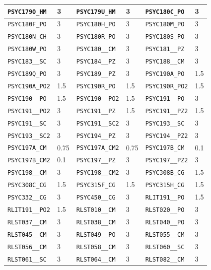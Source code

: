 \begin{longtable}{|l|l||l|l||l|l|}
    \verb|PSYC179O_HM| & 3 & \verb|PSYC179U_HM| & 3 & \verb|PSYC180C_PO| & 3\\\hline
    \verb|PSYC180F_PO| & 3 & \verb|PSYC180H_PO| & 3 & \verb|PSYC180M_PO| & 3\\\hline
    \verb|PSYC180N_CH| & 3 & \verb|PSYC180R_PO| & 3 & \verb|PSYC180S_PO| & 3\\\hline
    \verb|PSYC180W_PO| & 3 & \verb|PSYC180__CM| & 3 & \verb|PSYC181__PZ| & 3\\\hline
    \verb|PSYC183__SC| & 3 & \verb|PSYC184__PZ| & 3 & \verb|PSYC188__CM| & 3\\\hline
    \verb|PSYC189Q_PO| & 3 & \verb|PSYC189__PZ| & 3 & \verb|PSYC190A_PO| & 1.5\\\hline
    \verb|PSYC190A_PO2| & 1.5 & \verb|PSYC190R_PO| & 1.5 & \verb|PSYC190R_PO2| & 1.5\\\hline
    \verb|PSYC190__PO| & 1.5 & \verb|PSYC190__PO2| & 1.5 & \verb|PSYC191__PO| & 3\\\hline
    \verb|PSYC191__PO2| & 3 & \verb|PSYC191__PZ| & 1.5 & \verb|PSYC191__PZ2| & 1.5\\\hline
    \verb|PSYC191__SC| & 3 & \verb|PSYC191__SC2| & 3 & \verb|PSYC193__SC| & 3\\\hline
    \verb|PSYC193__SC2| & 3 & \verb|PSYC194__PZ| & 3 & \verb|PSYC194__PZ2| & 3\\\hline
    \verb|PSYC197A_CM| & 0.75 & \verb|PSYC197A_CM2| & 0.75 & \verb|PSYC197B_CM| & 0.1\\\hline
    \verb|PSYC197B_CM2| & 0.1 & \verb|PSYC197__PZ| & 3 & \verb|PSYC197__PZ2| & 3\\\hline
    \verb|PSYC198__CM| & 3 & \verb|PSYC198__CM2| & 3 & \verb|PSYC308B_CG| & 1.5\\\hline
    \verb|PSYC308C_CG| & 1.5 & \verb|PSYC315F_CG| & 1.5 & \verb|PSYC315H_CG| & 1.5\\\hline
    \verb|PSYC332__CG| & 3 & \verb|PSYC450__CG| & 3 & \verb|RLIT191__PO| & 1.5\\\hline
    \verb|RLIT191__PO2| & 1.5 & \verb|RLST010__CM| & 3 & \verb|RLST020__PO| & 3\\\hline
    \verb|RLST037__CM| & 3 & \verb|RLST038__CM| & 3 & \verb|RLST040__PO| & 3\\\hline
    \verb|RLST045__CM| & 3 & \verb|RLST049__PO| & 3 & \verb|RLST055__CM| & 3\\\hline
    \verb|RLST056__CM| & 3 & \verb|RLST058__CM| & 3 & \verb|RLST060__SC| & 3\\\hline
    \verb|RLST061__SC| & 3 & \verb|RLST064__CM| & 3 & \verb|RLST082__CM| & 3\\\hline

\end{longtable}
